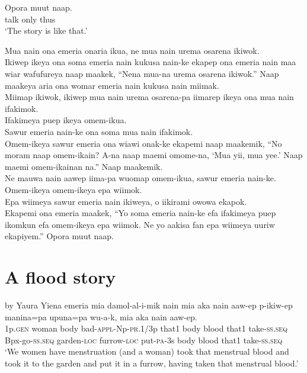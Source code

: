 \ea\label{ex:a:x17}
\gll  Opora  muut  naap. \\
talk  only  thus \\
\glt ‘The story is like that.’ \\
\z


Mua nain ona emeria onaria ikua, ne mua nain urema osarena ikiwok. \\
\textrm{Ikiwep ikeya ona soma emeria nain kukusa nain-ke ekapep ona emeria nain maa wiar wafufureya naap maakek, “Nena mua-na urema osarena ikiwok.”  }
Naap maakeya aria ona womar emeria nain kukusa nain miimak. \\
Miimap ikiwok, ikiwep mua nain urema osarena-pa iimarep ikeya ona mua nain ifakimok. \\
Ifakimeya puep ikeya omem-ikua. \\
Sawur emeria nain-ke ona soma mua nain ifakimok. \\
\textrm{Omem-ikeya sawur emeria ona wiawi onak-ke ekapemi naap maakemik, “No moram naap omem-ikain?  }
\textrm{A-na naap maemi omome-na, ‘Mua yii, mua yee.’ }
\textrm{Naap maemi omem-ikainan na.”  }
Naap maakemik. \\
Ne mauwa nain aawep iima-pa wuomap omem-ikua, sawur emeria nain-ke. \\
Omem-ikeya omem-ikeya epa wiimok. \\
Epa wiimeya sawur emeria nain ikiweya, o iikirami owowa ekapok. \\
\textrm{Ekapemi ona emeria maakek, “Yo soma emeria nain-ke efa ifakimeya puep ikomkun efa omem-ikeya epa wiimok.  }
\textrm{Ne yo aakisa fan epa wiimeya uuriw ekapiyem.”  }
Opora muut naap. \\ 
\setcounter{equation}{0}
\section{A flood story}  by Yaura
\ea\label{ex:a:x1}
\gll  Yiena  emeria  mia  damol-al-i-mik  nain  mia  aka  nain      aaw-ep  p-ikiw-ep  manina=pa  upuna=pa  wu-a-k,               mia  aka  nain  aaw-ep. \\
1p.\textsc{gen}  woman  body  bad-\textsc{appl}-Np-\textsc{pr}.1/3p  that1  body  blood  that1 take-\textsc{ss.seq}  Bpx-go-\textsc{ss.seq}  garden-\textsc{loc}  furrow-\textsc{loc}  put-\textsc{pa}-3s body  blood  that1  take-\textsc{ss.seq} \\




\glt ‘We women have menstruation (and a woman) took that menstrual blood and took it to the garden and put it in a furrow, having taken that menstrual blood.’ \\
\z


